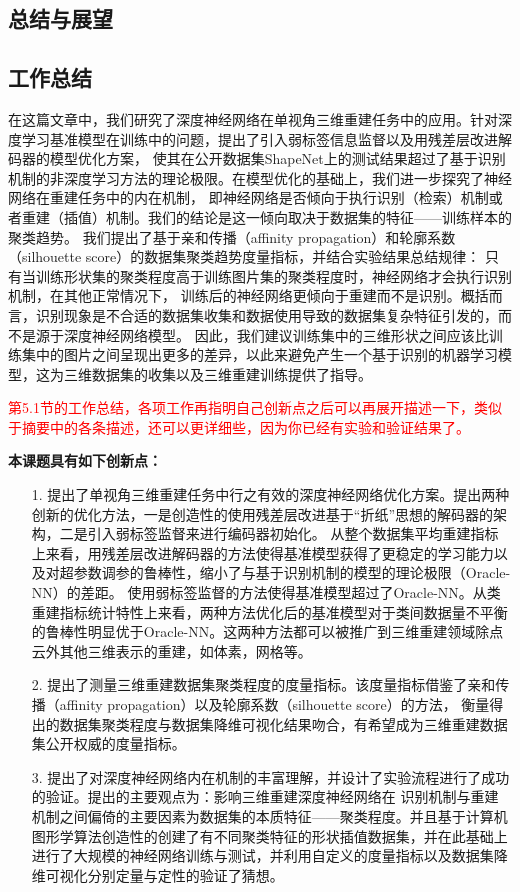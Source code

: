 \documentclass[bachelor, nocolorlinks, printoneside]{seuthesis} %
\newcommand\COMM[1]{\textcolor{red}{#1}}
\begin{document}
\begin{Main}
\chapter{总结与展望}

\section{工作总结}
在这篇文章中，我们研究了深度神经网络在单视角三维重建任务中的应用。针对深度学习基准模型在训练中的问题，提出了引入弱标签信息监督以及用残差层改进解码器的模型优化方案，
使其在公开数据集ShapeNet上的测试结果超过了基于识别机制的非深度学习方法的理论极限。在模型优化的基础上，我们进一步探究了神经网络在重建任务中的内在机制，
即神经网络是否倾向于执行识别（检索）机制或者重建（插值）机制。我们的结论是这一倾向取决于数据集的特征——训练样本的聚类趋势。
我们提出了基于亲和传播（affinity propagation）和轮廓系数（silhouette score）的数据集聚类趋势度量指标，并结合实验结果总结规律：
只有当训练形状集的聚类程度高于训练图片集的聚类程度时，神经网络才会执行识别机制，在其他正常情况下，
训练后的神经网络更倾向于重建而不是识别。概括而言，识别现象是不合适的数据集收集和数据使用导致的数据集复杂特征引发的，而不是源于深度神经网络模型。
因此，我们建议训练集中的三维形状之间应该比训练集中的图片之间呈现出更多的差异，以此来避免产生一个基于识别的机器学习模型，这为三维数据集的收集以及三维重建训练提供了指导。

\COMM{第5.1节的工作总结，各项工作再指明自己创新点之后可以再展开描述一下，类似于摘要中的各条描述，还可以更详细些，因为你已经有实验和验证结果了。}

\noindent
\textbf{本课题具有如下创新点：}
\begin{itemize}
    \item[1.] 提出了单视角三维重建任务中行之有效的深度神经网络优化方案。提出两种创新的优化方法，一是创造性的使用残差层改进基于“折纸”思想的解码器的架构，二是引入弱标签监督来进行编码器初始化。
    从整个数据集平均重建指标上来看，用残差层改进解码器的方法使得基准模型获得了更稳定的学习能力以及对超参数调参的鲁棒性，缩小了与基于识别机制的模型的理论极限（Oracle-NN）的差距。
    使用弱标签监督的方法使得基准模型超过了Oracle-NN。从类重建指标统计特性上来看，两种方法优化后的基准模型对于类间数据量不平衡的鲁棒性明显优于Oracle-NN。这两种方法都可以被推广到三维重建领域除点云外其他三维表示的重建，如体素，网格等。
    \item[2.] 提出了测量三维重建数据集聚类程度的度量指标。该度量指标借鉴了亲和传播（affinity propagation）以及轮廓系数（silhouette score）的方法，
    衡量得出的数据集聚类程度与数据集降维可视化结果吻合，有希望成为三维重建数据集公开权威的度量指标。
    \item[3.] 提出了对深度神经网络内在机制的丰富理解，并设计了实验流程进行了成功的验证。提出的主要观点为：影响三维重建深度神经网络在
    识别机制与重建机制之间偏倚的主要因素为数据集的本质特征——聚类程度。并且基于计算机图形学算法创造性的创建了有不同聚类特征的形状插值数据集，并在此基础上
    进行了大规模的神经网络训练与测试，并利用自定义的度量指标以及数据集降维可视化分别定量与定性的验证了猜想。
\end{itemize}


\end{Main}
\end{document}
